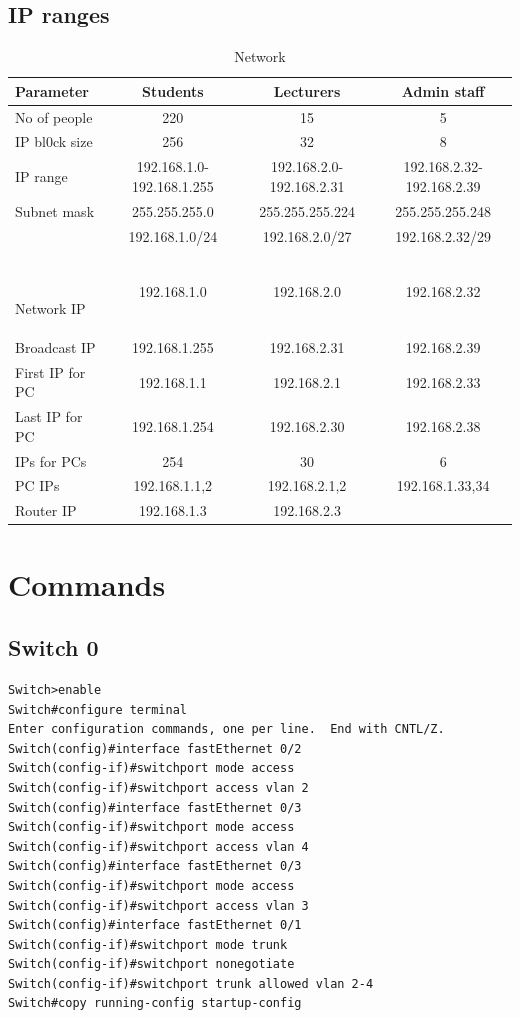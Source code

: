 \documentclass{article}
\begin{document}
\subsection{IP ranges}
\begin{table}[h]
    \centering
    \begin{tabular}{|l|c|c|c|}
         \hline
         Parameter&Students&Lecturers&Admin staff  \\
         \hline
         No of people&220&15&5\\
         IP bl0ck size&256&32&8\\
         IP range&192.168.1.0-192.168.1.255&192.168.2.0-192.168.2.31&192.168.2.32-192.168.2.39\\
         Subnet mask&255.255.255.0&255.255.255.224&255.255.255.248\\
         &192.168.1.0/24 & 192.168.2.0/27 & 192.168.2.32/29\\\
         
         Network IP&192.168.1.0&192.168.2.0&192.168.2.32\\
         Broadcast IP&192.168.1.255&192.168.2.31&192.168.2.39\\
         First IP for PC&192.168.1.1&192.168.2.1&192.168.2.33\\
         Last IP for PC&192.168.1.254&192.168.2.30&192.168.2.38\\
         IPs for PCs&254&30&6\\
         \hline
         PC IPs&192.168.1.1,2&192.168.2.1,2&192.168.1.33,34\\
         Router IP&192.168.1.3&192.168.2.3&\\
         
         \hline
    \end{tabular}
    \caption{Network}
    \label{tab:my_label}
\end{table}

\section{Commands}

\subsection{Switch 0}

\begin{lstlisting}[language=CISCO] 
Switch>enable
Switch#configure terminal 
Enter configuration commands, one per line.  End with CNTL/Z.
Switch(config)#interface fastEthernet 0/2
Switch(config-if)#switchport mode access
Switch(config-if)#switchport access vlan 2
Switch(config)#interface fastEthernet 0/3
Switch(config-if)#switchport mode access
Switch(config-if)#switchport access vlan 4
Switch(config)#interface fastEthernet 0/3
Switch(config-if)#switchport mode access
Switch(config-if)#switchport access vlan 3
Switch(config)#interface fastEthernet 0/1
Switch(config-if)#switchport mode trunk
Switch(config-if)#switchport nonegotiate
Switch(config-if)#switchport trunk allowed vlan 2-4
Switch#copy running-config startup-config

\end{lstlisting} 
\end{document}
